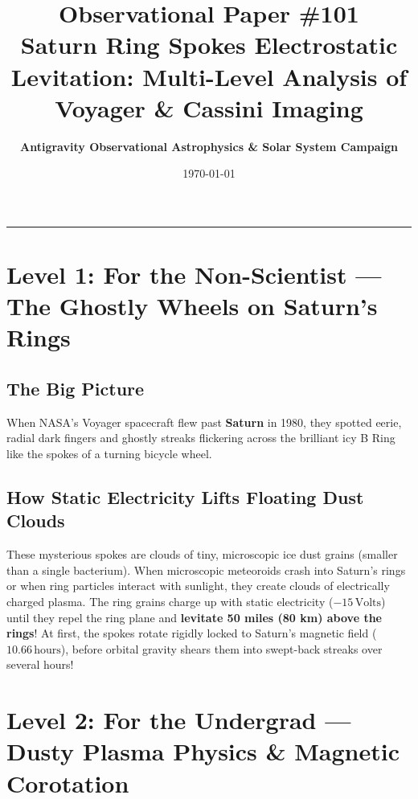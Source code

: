 \documentclass[11pt,a4paper]{article}
\title{\Huge \textbf{Observational Paper \#101}\\ \Large Saturn Ring Spokes Electrostatic Levitation: Multi-Level Analysis of Voyager \& Cassini Imaging}
\author{\textbf{Antigravity Observational Astrophysics \& Solar System Campaign}}
\date{\today}
\begin{document}
\maketitle

\vspace{-1em}
\begin{center}
\rule{\textwidth}{1.5pt}
\end{center}

\section*{Level 1: For the Non-Scientist — The Ghostly Wheels on Saturn's Rings}

\subsection*{The Big Picture}
When NASA's Voyager spacecraft flew past \textbf{Saturn} in 1980, they spotted eerie, radial dark fingers and ghostly streaks flickering across the brilliant icy B Ring like the spokes of a turning bicycle wheel.

\subsection*{How Static Electricity Lifts Floating Dust Clouds}
These mysterious spokes are clouds of tiny, microscopic ice dust grains (smaller than a single bacterium). When microscopic meteoroids crash into Saturn's rings or when ring particles interact with sunlight, they create clouds of electrically charged plasma. The ring grains charge up with static electricity ($-15\,\text{Volts}$) until they repel the ring plane and \textbf{levitate 50 miles (80 km) above the rings}! At first, the spokes rotate rigidly locked to Saturn's magnetic field ($10.66\,\text{hours}$), before orbital gravity shears them into swept-back streaks over several hours!

\newpage

\section*{Level 2: For the Undergrad — Dusty Plasma Physics \& Magnetic Corotation}
\end{document}
